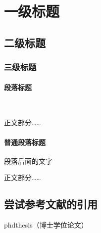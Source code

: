 \documentclass[oneside]{cdut_thesis} %
\begin{document}

\setcounter{page}{1}   %


{\thispagestyle{fancy}}  %
\null \tableofcontents         %
{\thispagestyle{fancy}}  %


\newpage
\setcounter{page}{1}    %

\null\par
\section{一级标题}
\subsection{二级标题}
\subsubsection{三级标题}
\paragraph{段落标题}~{}\par

正文部分……

\paragraph{普通段落标题}段落后面的文字


正文部分……


\subsection{尝试参考文献的引用}
phdthesis（博士学位论文）\cite{phdthesis_example}
\end{document}
